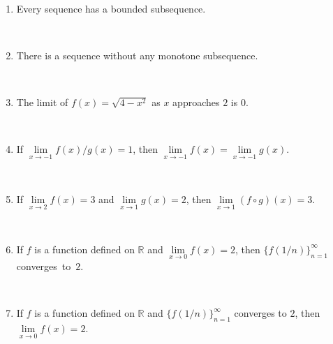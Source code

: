 \documentclass[12pt]{amsart}
\newcommand{\R}{{\mathbb{R}}}
\numberwithin{equation}{section}
\theoremstyle{plain} %
\theoremstyle{definition}
\theoremstyle{remark}
\begin{document}
		\

		
		\begin{enumerate}
		
		
	\item  Every sequence has a bounded subsequence.
	
	\
	
	
	
	\item  There is a sequence without any monotone subsequence.
	
	\
	
	
	
	
	

	
	\item  The limit of $f(x)=\sqrt{4-x^2}$ as $x$ approaches $2$ is $0$.
	
	\
	

	

	\item  If $\lim\limits_{x\to -1} f(x)/g(x) =1$, then $\lim\limits_{x\to -1} f(x)=\lim\limits_{x\to -1} g(x)$.
		
	\
	


	

	 
	 

	 

 
 \item  If $\lim\limits_{x\to 2} f(x) = 3$ and $\lim\limits_{x\to 1} g(x) =2$, then $\lim\limits_{x\to 1} (f \circ g)(x) = 3$.


\
 

 
 	  \item  If $f$ is a function defined on $\R$ and $\lim\limits_{x\to 0} f(x)=2$, then $\{ f(1/n) \}_{n=1}^\infty$ converges~to~$2$.
 
 \
 
 \item  If $f$ is a function defined on $\R$ and $\{ f(1/n) \}_{n=1}^\infty$ converges to $2$, then
 ${\lim\limits_{x\to 0} f(x)=2}$.
 

\end{enumerate}
\end{document}
